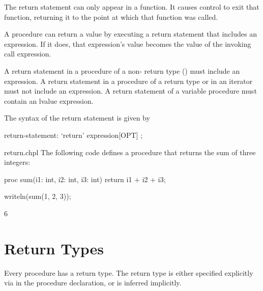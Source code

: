 The return statement can only appear in a function.  It causes control
to exit that function, returning it to the point at which that function
was called.

A procedure can return a value by executing a return statement
that includes an expression. If it does, that expression's value
becomes the value of the invoking call expression.

A return statement in a procedure of a non- return type
() must include an expression.
A return statement in a procedure of a  return type
or in an iterator must not include an expression.
A return statement of a variable procedure must contain an lvalue expression.


The syntax of the return statement is given by
\begin{syntax}
return-statement:
  `return' expression[OPT] ;
\end{syntax}

\begin{chapelexample}{return.chpl}
The following code defines a procedure that returns the sum of three
integers:
\begin{chapel}
proc sum(i1: int, i2: int, i3: int)
  return i1 + i2 + i3;
\end{chapel}
\begin{chapelpost}
writeln(sum(1, 2, 3));
\end{chapelpost}
\begin{chapeloutput}
6
\end{chapeloutput}
\end{chapelexample}


\section{Return Types}
\label{Return_Types}

Every procedure has a return type. The return type is either
specified explicitly via  in the procedure
declaration, or is inferred implicitly.


